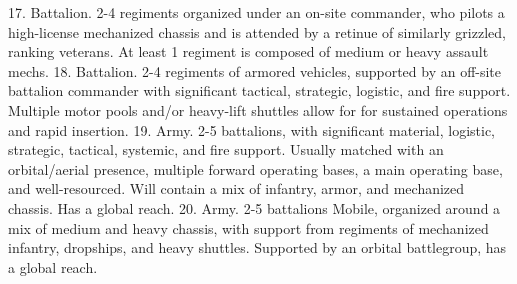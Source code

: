 17. Battalion. 2-4 regiments organized under an on-site commander, who pilots a high-license
    mechanized chassis and is attended by a retinue of similarly grizzled, ranking veterans. At
    least 1 regiment is composed of medium or heavy assault mechs.
18. Battalion. 2-4 regiments of armored vehicles, supported by an off-site battalion
    commander with significant tactical, strategic, logistic, and fire support. Multiple motor
    pools and/or heavy-lift shuttles allow for for sustained operations and rapid insertion.
19. Army. 2-5 battalions, with significant material, logistic, strategic, tactical, systemic, and fire
    support. Usually matched with an orbital/aerial presence, multiple forward operating
    bases, a main operating base, and well-resourced. Will contain a mix of infantry, armor,
    and mechanized chassis. Has a global reach.
20. Army. 2-5 battalions Mobile, organized around a mix of medium and heavy chassis, with
    support from regiments of mechanized infantry, dropships, and heavy shuttles. Supported
    by an orbital battlegroup, has a global reach.